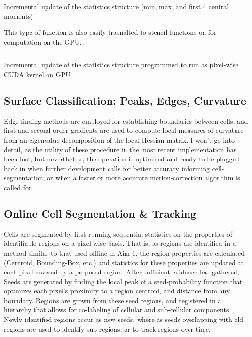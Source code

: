 \documentclass[../main.tex]{subfiles}
\begin{document}
\begin{listing}[ht]
\inputminted{matlab}{updateStatisticStructure.m}
\caption{Incremental update of the statistics structure (min, max, and first 4 central moments)}
\label{listing:update-statistic}
\end{listing}

This type of function is also easily trasnalted to stencil functions on for computation on the GPU.

\begin{listing}[ht]
\inputminted{matlab}{updateStatisticsGPU.m}
\caption{Incremental update of the statistics structure programmed to run as pixel-wise CUDA kernel on GPU}
\label{listing:update-statistic-gpu}
\end{listing}


\subsection{Surface Classification: Peaks, Edges, Curvature}\label{sec:surface-classification-peaks-edges-curvature}

Edge-finding methods are employed for establishing boundaries between cells, and first and second-order gradients are used to compute local measures of curvature from an eigenvalue decomposition of the local Hessian matrix.
I won't go into detail, as the utility of these procedure in the most recent implementation has been lost, but nevertheless, the operation is optimized and ready to be plugged back in when further development calls for better accuracy informing cell-segmentation, or when a faster or more accurate motion-correction algorithm is called for.

\subsection{Online Cell Segmentation \& Tracking}\label{sec:online-cell-segmentation-tracking}

Cells are segmented by first running sequential statistics on the properties of identifiable regions on a pixel-wise basis.
That is, as regions are identified in a method similar to that used offline in Aim 1, the region-properties are calculated (Centroid, Bounding-Box, etc.) and statistics for these properties are updated at each pixel covered by a proposed region.
After sufficient evidence has gathered, Seeds are generated by finding the local peak of a seed-probability function that optimizes each pixel's proximity to a region centroid, and distance from any boundary.
Regions are grown from these seed regions, and registered in a hierarchy that allows for co-labeling of cellular and sub-cellular components.
Newly identified regions occur as new seeds, where as seeds overlapping with old regions are used to identify sub-regions, or to track regions over time.
\end{document}

